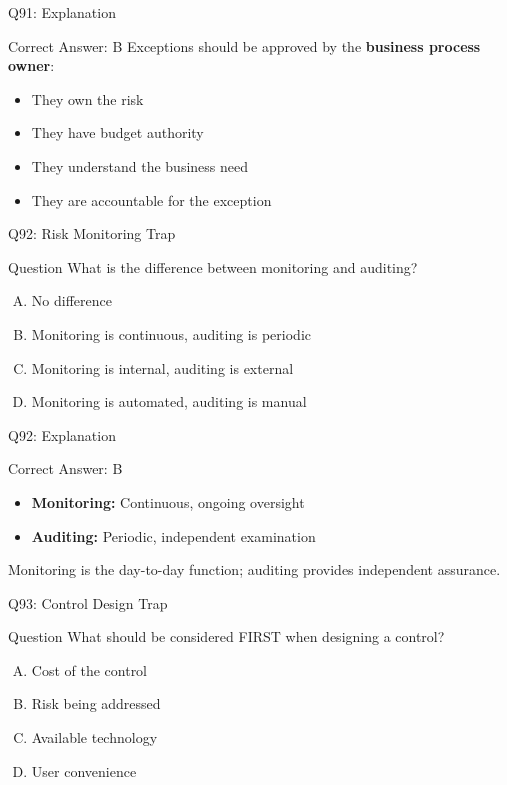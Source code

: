 \documentclass{beamer}
\begin{document}
	\begin{frame}{Q91: Explanation}
		\begin{block}{Correct Answer: B}
			Exceptions should be approved by the \textbf{business process owner}:
			\begin{itemize}
				\item They own the risk
				\item They have budget authority
				\item They understand the business need
				\item They are accountable for the exception
			\end{itemize}
		\end{block}
	\end{frame}
	
	\begin{frame}{Q92: Risk Monitoring Trap}
		\begin{block}{Question}
			What is the difference between monitoring and auditing?
		\end{block}
		\begin{enumerate}[(A)]
			\item No difference
			\item Monitoring is continuous, auditing is periodic
			\item Monitoring is internal, auditing is external
			\item Monitoring is automated, auditing is manual
		\end{enumerate}
	\end{frame}
	
	\begin{frame}{Q92: Explanation}
		\begin{block}{Correct Answer: B}
			\begin{itemize}
				\item \textbf{Monitoring:} Continuous, ongoing oversight
				\item \textbf{Auditing:} Periodic, independent examination
			\end{itemize}
			Monitoring is the day-to-day function; auditing provides independent assurance.
		\end{block}
	\end{frame}
	
	\begin{frame}{Q93: Control Design Trap}
		\begin{block}{Question}
			What should be considered FIRST when designing a control?
		\end{block}
		\begin{enumerate}[(A)]
			\item Cost of the control
			\item Risk being addressed
			\item Available technology
			\item User convenience
		\end{enumerate}
	\end{frame}
	
\end{document}
